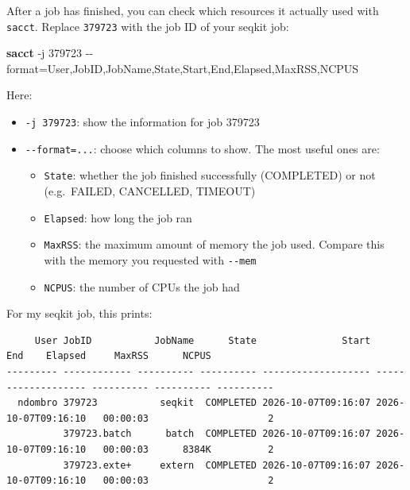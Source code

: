 \documentclass[
  letterpaper,
  DIV=11,
  numbers=noendperiod]{scrreprt}
\newenvironment{Shaded}{}{}
\newcommand{\AttributeTok}[1]{\textcolor[rgb]{0.84,0.23,0.29}{#1}}
\newcommand{\ExtensionTok}[1]{\textcolor[rgb]{0.84,0.23,0.29}{\textbf{#1}}}
\newcommand{\NormalTok}[1]{\textcolor[rgb]{0.14,0.16,0.18}{#1}}
\newcommand{\OperatorTok}[1]{\textcolor[rgb]{0.14,0.16,0.18}{#1}}
\providecommand{\tightlist}{%
  \setlength{\itemsep}{0pt}\setlength{\parskip}{0pt}}
\begin{document}
\begin{tcolorbox}[enhanced jigsaw, colbacktitle=quarto-callout-tip-color!10!white, rightrule=.15mm, leftrule=.75mm, colback=white, opacitybacktitle=0.6, title=\textcolor{quarto-callout-tip-color}{\faLightbulb}\hspace{0.5em}{Tip: Checking the resources a job used with sacct (optional)}, bottomrule=.15mm, left=2mm, colframe=quarto-callout-tip-color-frame, opacityback=0, breakable, bottomtitle=1mm, coltitle=black, arc=.35mm, toprule=.15mm, toptitle=1mm, titlerule=0mm]

After a job has finished, you can check which resources it actually used
with \texttt{sacct}. Replace \texttt{379723} with the job ID of your
seqkit job:

\begin{Shaded}
\begin{Highlighting}[]
\ExtensionTok{sacct} \AttributeTok{{-}j}\NormalTok{ 379723 }\AttributeTok{{-}{-}format}\OperatorTok{=}\NormalTok{User,JobID,JobName,State,Start,End,Elapsed,MaxRSS,NCPUS}
\end{Highlighting}
\end{Shaded}

Here:

\begin{itemize}
\tightlist
\item
  \texttt{-j\ 379723}: show the information for job 379723
\item
  \texttt{-\/-format=...}: choose which columns to show. The most useful
  ones are:

  \begin{itemize}
  \tightlist
  \item
    \texttt{State}: whether the job finished successfully (COMPLETED) or
    not (e.g.~FAILED, CANCELLED, TIMEOUT)
  \item
    \texttt{Elapsed}: how long the job ran
  \item
    \texttt{MaxRSS}: the maximum amount of memory the job used. Compare
    this with the memory you requested with \texttt{-\/-mem}
  \item
    \texttt{NCPUS}: the number of CPUs the job had
  \end{itemize}
\end{itemize}

For my seqkit job, this prints:

\begin{verbatim}
     User JobID           JobName      State               Start                 End    Elapsed     MaxRSS      NCPUS
--------- ------------ ---------- ---------- ------------------- ------------------- ---------- ---------- ----------
  ndombro 379723           seqkit  COMPLETED 2026-10-07T09:16:07 2026-10-07T09:16:10   00:00:03                     2
          379723.batch      batch  COMPLETED 2026-10-07T09:16:07 2026-10-07T09:16:10   00:00:03      8384K          2
          379723.exte+     extern  COMPLETED 2026-10-07T09:16:07 2026-10-07T09:16:10   00:00:03                     2
\end{verbatim}


\end{tcolorbox}
\end{document}
